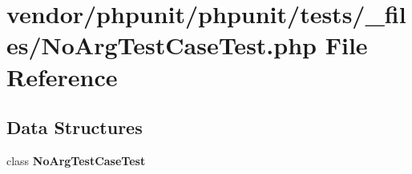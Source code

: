 \section{vendor/phpunit/phpunit/tests/\+\_\+files/\+No\+Arg\+Test\+Case\+Test.php File Reference}
\label{_no_arg_test_case_test_8php}
\subsection*{Data Structures}
\begin{DoxyCompactItemize}
\item 
class {\bf No\+Arg\+Test\+Case\+Test}
\end{DoxyCompactItemize}
